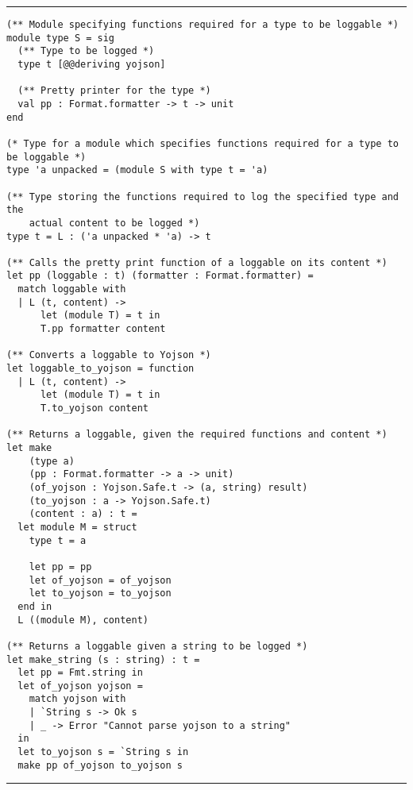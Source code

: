 \vspace{2em}
\noindent\rule{\textwidth}{0.5pt}
\vspace{-0.6cm}
\begin{verbatim}
(** Module specifying functions required for a type to be loggable *)
module type S = sig
  (** Type to be logged *)
  type t [@@deriving yojson]

  (** Pretty printer for the type *)
  val pp : Format.formatter -> t -> unit
end

(* Type for a module which specifies functions required for a type to be loggable *)
type 'a unpacked = (module S with type t = 'a)

(** Type storing the functions required to log the specified type and the
    actual content to be logged *)
type t = L : ('a unpacked * 'a) -> t

(** Calls the pretty print function of a loggable on its content *)
let pp (loggable : t) (formatter : Format.formatter) =
  match loggable with
  | L (t, content) ->
      let (module T) = t in
      T.pp formatter content

(** Converts a loggable to Yojson *)
let loggable_to_yojson = function
  | L (t, content) ->
      let (module T) = t in
      T.to_yojson content

(** Returns a loggable, given the required functions and content *)
let make
    (type a)
    (pp : Format.formatter -> a -> unit)
    (of_yojson : Yojson.Safe.t -> (a, string) result)
    (to_yojson : a -> Yojson.Safe.t)
    (content : a) : t =
  let module M = struct
    type t = a

    let pp = pp
    let of_yojson = of_yojson
    let to_yojson = to_yojson
  end in
  L ((module M), content)

(** Returns a loggable given a string to be logged *)
let make_string (s : string) : t =
  let pp = Fmt.string in
  let of_yojson yojson =
    match yojson with
    | `String s -> Ok s
    | _ -> Error "Cannot parse yojson to a string"
  in
  let to_yojson s = `String s in
  make pp of_yojson to_yojson s
\end{verbatim}
\vspace{-0.4cm}
\noindent\rule{\textwidth}{0.5pt}
\vspace{-0.6cm}
\label{lst:loggable}

